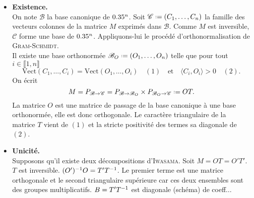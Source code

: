 \begin{preuve}
    \begin{itemize}
        \item \textbf{Existence.} \\
        On note $\mathscr{B}$ la base canonique de $0.35^n$. Soit $\mathscr{C} \defeq (C_1, \dots, C_n)$ la famille des vecteurs colonnes de la matrice $M$ exprimés dans $\mathscr{B}$. Comme $M$ est inversible, $\mathscr{C}$ forme une base de $0.35^n$. Appliquons-lui le procédé d'orthonormalisation de \textsc{Gram}-\textsc{Schmidt}. \\
        Il existe une base orthonormée $\mathscr{B}_O \defeq (O_1, \dots, O_n)$ telle que pour tout $i \in \llbracket 1, n \rrbracket$
        $$\mathrm{Vect}(C_1, \dots, C_i) = \mathrm{Vect}(O_1,\dots, O_i) \quad (1) \quad \text{et} \quad \langle C_i, O_i \rangle > 0 \quad (2).$$
        On écrit 
        $$M = P_{\mathscr{B} \to \mathscr{C}} = P_{\mathscr{B} \to \mathscr{B}_O} \times P_{\mathscr{B}_O \to \mathscr{C}} \defeq OT.$$
        La matrice $O$ est une matrice de passage de la base canonique à une base orthonormée, elle est donc orthogonale. 
        Le caractère triangulaire de la matrice $T$ vient de $(1)$ et la stricte positivité des termes sa diagonale de $(2)$.
        \item \textbf{Unicité.} \\
        Supposons qu'il existe deux décompositions d'\textsc{Iwasama}.
        Soit $M = OT = O'T'$. $T$ est inversible. $(O')^{-1}O =T'T^{-1}$. Le premier terme est une matrice orthogonale et le second triangulaire supérieure car ces deux ensembles sont des groupes multiplicatifs. $B = T'T^{-1}$ est diagonale (schéma) de coeff...
    \end{itemize} 
\end{preuve}